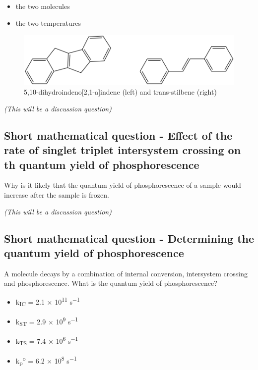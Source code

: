 \documentclass[
]{book}
\providecommand{\tightlist}{%
  \setlength{\itemsep}{0pt}\setlength{\parskip}{0pt}}
\begin{document}
\begin{itemize}
\tightlist
\item
  the two molecules
\item
  the two temperatures
\end{itemize}

\begin{figure}

{\centering \includegraphics[width=0.6\linewidth]{Images/stilbeneindene} 

}

\caption{5,10-dihydroindeno[2,1-a]indene (left) and trans-stilbene (right)}\label{fig:stilbeneindene}
\end{figure}

\emph{(This will be a discussion question)}

\hypertarget{sec:ratephos}{%
\subsection{Short mathematical question - Effect of the rate of singlet triplet intersystem crossing on th quantum yield of phosphorescence}\label{sec:ratephos}}

Why is it likely that the quantum yield of phosphorescence of a sample would increase after the sample is frozen.

\emph{(This will be a discussion question)}

\hypertarget{sec:calcphos}{%
\subsection{Short mathematical question - Determining the quantum yield of phosphorescence}\label{sec:calcphos}}

A molecule decays by a combination of internal conversion, intersystem crossing and phosphorescence. What is the quantum yield of phosphorescence?

\begin{itemize}
\tightlist
\item
  k\textsubscript{IC} = 2.1 × 10\textsuperscript{11} s\textsuperscript{−1}
\item
  k\textsubscript{ST} = 2.9 × 10\textsuperscript{9} s\textsuperscript{−1}
\item
  k\textsubscript{TS} = 7.4 × 10\textsuperscript{6} s\textsuperscript{−1}
\item
  k\textsubscript{p}\textsuperscript{o} = 6.2 × 10\textsuperscript{8} s\textsuperscript{−1}
\end{itemize}
\end{document}
